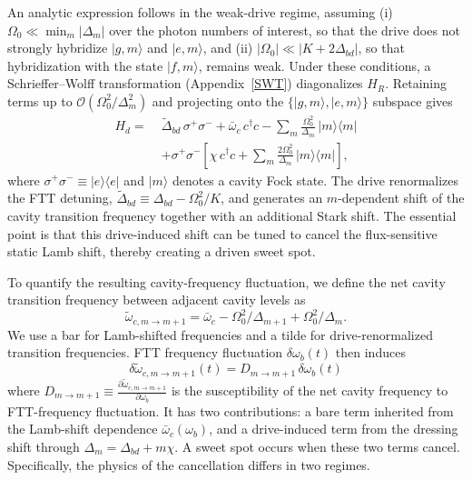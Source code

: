 An analytic expression follows in the weak-drive regime, assuming (i) $\Omega_0 \ll \min_m|\Delta_m|$ over the photon numbers of interest, so that the drive does not strongly hybridize $|g,m\rangle$ and $|e,m\rangle$, and (ii) $|\Omega_0|\ll |K+2\Delta_{bd}|$, so that hybridization with the state $|f,m\rangle$, remains weak. Under these conditions, a Schrieffer--Wolff transformation (Appendix~\ref{SWT}) diagonalizes $H_R$. Retaining terms up to $\mathcal{O}(\Omega_0^2/\Delta_m^2)$ and projecting onto the $\{|g,m\rangle,|e,m\rangle\}$ subspace gives
\begin{equation}
\label{eq:mainHd_two_level}
\begin{aligned}
H_d =\;&
\widetilde{\Delta}_{bd}\,\sigma^+\sigma^-
+\bar\omega_c\,c^\dagger c
-\sum_m \frac{\Omega_0^2}{\Delta_m}\,|m\rangle\langle m|
\\
&+\sigma^+\sigma^-\!\left[
\chi\,c^\dagger c
+\sum_m \frac{2\Omega_0^2}{\Delta_m}\,|m\rangle\langle m|
\right],
\end{aligned}
\end{equation}
where $\sigma^+\sigma^- \equiv |e\rangle\langle e|$ and $|m\rangle$ denotes a cavity Fock state. The drive renormalizes the FTT detuning, $\widetilde{\Delta}_{bd}\equiv \Delta_{bd}-\Omega_0^2/K$, and generates an $m$-dependent shift of the cavity transition frequency together with an additional Stark shift. The essential point is that this drive-induced shift can be tuned to cancel the flux-sensitive static Lamb shift, thereby creating a driven sweet spot.

To quantify the resulting cavity-frequency fluctuation, we define the net cavity
transition frequency between adjacent cavity levels as
\begin{equation}
\label{perturbation energy}
\widetilde{\omega}_{c,m\rightarrow m+1}=\bar{\omega}_c-\Omega_0^2/\Delta_{m+1}+\Omega_0^2/\Delta_m.
\end{equation}
We use a bar for Lamb-shifted frequencies and a tilde for drive-renormalized transition frequencies.
FTT frequency fluctuation $\delta\omega_b(t)$ then induces
\begin{equation}
\delta\widetilde{\omega}_{c,m\rightarrow m+1}(t)= D_{m\rightarrow m+1}\,\delta\omega_b(t)
\end{equation}
where $D_{m\rightarrow m+1}\equiv \frac{\partial \widetilde{\omega}_{c,m\rightarrow m+1}}{\partial \omega_b}$ is the susceptibility of the net cavity frequency to FTT-frequency fluctuation.
It has two contributions: a bare term inherited from the Lamb-shift dependence
$\bar{\omega}_c(\omega_b)$, and a drive-induced term from the dressing shift through $\Delta_m=\Delta_{bd}+m\chi$. A sweet spot occurs when these two terms cancel. Specifically, the physics of the cancellation differs in two regimes.


